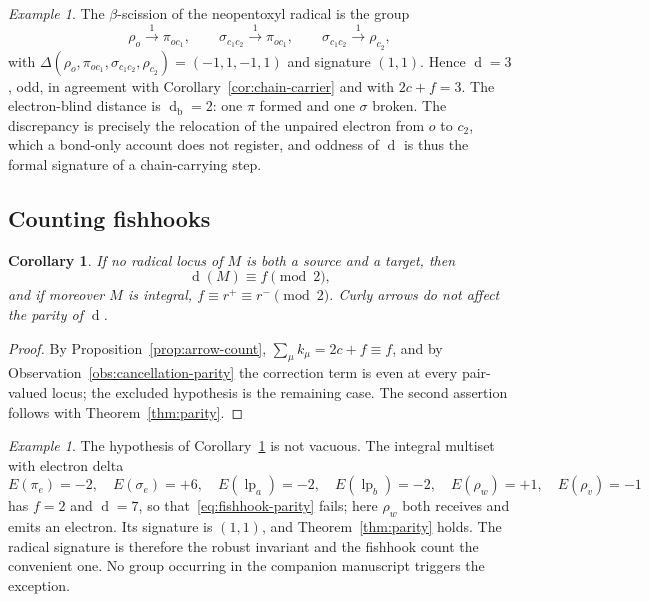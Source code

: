 \documentclass[11pt]{article}
\numberwithin{equation}{section}
\newcommand{\lp}{\operatorname{lp}}
\newcommand{\del}{\operatorname{d}}
\theoremstyle{plain}
\newtheorem{corollary}[theorem]{Corollary}
\theoremstyle{definition}
\theoremstyle{remark}
\newtheorem{example}[theorem]{Example}
\begin{document}
\begin{example}
\label{ex:beta-scission}
The $\beta$-scission of the neopentoxyl radical is the group
\[
  \rho_o\xrightarrow{1}\pi_{oc_1},\qquad
  \sigma_{c_1c_2}\xrightarrow{1}\pi_{oc_1},\qquad
  \sigma_{c_1c_2}\xrightarrow{1}\rho_{c_2},
\]
with $\Delta(\rho_o,\pi_{oc_1},\sigma_{c_1c_2},\rho_{c_2})=(-1,1,-1,1)$ and
signature $(1,1)$.  Hence $\del=3$, odd, in agreement with
Corollary~\ref{cor:chain-carrier} and with $2c+f=3$.  The electron-blind
distance is $\del_{\mathrm b}=2$: one $\pi$ formed and one $\sigma$ broken.
The discrepancy is precisely the relocation of the unpaired electron from $o$
to $c_2$, which a bond-only account does not register, and oddness of $\del$ is
thus the formal signature of a chain-carrying step.
\end{example}

\subsection{Counting fishhooks}

\begin{corollary}
\label{cor:fishhook}
If no radical locus of $M$ is both a source and a target, then
\begin{equation}
  \del(M)\equiv f\pmod 2 ,
  \label{eq:fishhook-parity}
\end{equation}
and if moreover $M$ is integral, $f\equiv r^+\equiv r^-\pmod2$.  Curly arrows
do not affect the parity of $\del$.
\end{corollary}

\begin{proof}
By Proposition~\ref{prop:arrow-count}, $\sum_\mu k_\mu=2c+f\equiv f$, and by
Observation~\ref{obs:cancellation-parity} the correction term is even at every
pair-valued locus; the excluded hypothesis is the remaining case.  The second
assertion follows with Theorem~\ref{thm:parity}.
\end{proof}

\begin{example}
\label{ex:fishhook-fails}
The hypothesis of Corollary~\ref{cor:fishhook} is not vacuous.  The integral
multiset with electron delta
\[
  E(\pi_e)=-2,\quad E(\sigma_e)=+6,\quad E(\lp_a)=-2,\quad E(\lp_b)=-2,\quad
  E(\rho_w)=+1,\quad E(\rho_v)=-1
\]
has $f=2$ and $\del=7$, so that~\eqref{eq:fishhook-parity} fails; here $\rho_w$
both receives and emits an electron.  Its signature is $(1,1)$, and
Theorem~\ref{thm:parity} holds.  The radical signature is therefore the robust
invariant and the fishhook count the convenient one.  No group occurring in
the companion manuscript triggers the exception.
\end{example}
\end{document}
